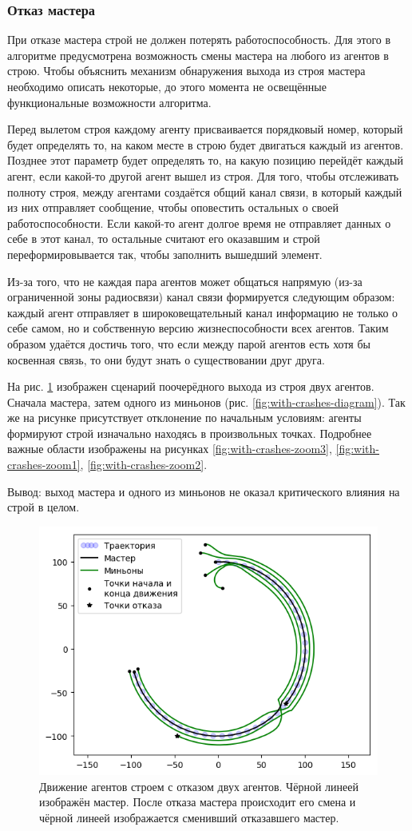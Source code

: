 \documentclass[a4paper, 14pt]{extarticle}
\let\Oldsubsubsection\subsubsection
\renewcommand{\subsubsection}{\FloatBarrier\Oldsubsubsection}
\begin{document}
\subsubsection{Отказ мастера}
При отказе мастера строй не должен потерять работоспособность. Для этого в алгоритме предусмотрена возможность смены мастера на любого из агентов в строю. Чтобы объяснить механизм обнаружения выхода из строя мастера необходимо описать некоторые, до этого момента не освещённые функциональные возможности алгоритма. \par
Перед вылетом строя каждому агенту присваивается порядковый номер, который будет определять то, на каком месте в строю будет двигаться каждый из агентов. Позднее этот параметр будет определять то, на какую позицию перейдёт каждый агент, если какой-то другой агент вышел из строя. Для того, чтобы отслеживать полноту строя, между агентами создаётся общий канал связи, в который каждый из них отправляет сообщение, чтобы оповестить остальных о своей работоспособности. Если какой-то агент долгое время не отправляет данных о себе в этот канал, то остальные считают его оказавшим и строй переформировывается так, чтобы заполнить вышедший элемент. \par
Из-за того, что не каждая пара агентов может общаться напрямую (из-за ограниченной зоны радиосвязи) канал связи формируется следующим образом: каждый агент отправляет в широковещательный канал информацию не только о себе самом, но и собственную версию жизнеспособности всех агентов. Таким образом удаётся достичь того, что если между парой агентов есть хотя бы косвенная связь, то они будут знать о существовании друг друга.\par
\bigskip
На рис. \ref{fig:with-crashes} изображен сценарий поочерёдного выхода из строя двух агентов. Сначала мастера, затем одного из миньонов (рис. \ref{fig:with-crashes-diagram}). Так же на рисунке присутствует отклонение по начальным условиям: агенты формируют строй изначально находясь в произвольных точках. Подробнее важные области изображены на рисунках \ref{fig:with-crashes-zoom3}, \ref{fig:with-crashes-zoom1}, \ref{fig:with-crashes-zoom2}. \par
Вывод: выход мастера и одного из миньонов не оказал критического влияния на строй в целом.
\begin{figure}
	\centering
	\includegraphics[width=0.7\linewidth]{platoon/with-crashes}
	\caption{Движение агентов строем с отказом двух агентов. Чёрной линеей изображён мастер. После отказа мастера происходит его смена и чёрной линеей изображается сменивший отказавшего мастер. }
	\label{fig:with-crashes}
\end{figure}
\end{document}
